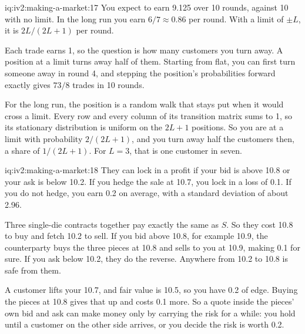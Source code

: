\begin{solution}{iq:iv2:making-a-market:17}
You expect to earn 9.125 over 10 rounds, against 10 with no limit. In the long run you earn $6/7 \approx 0.86$ per round. With a limit of $\pm L$, it is $2L/(2L + 1)$ per round.

Each trade earns 1, so the question is how many customers you turn away. A position at a limit turns away half of them. Starting from flat, you can first turn someone away in round 4, and stepping the position's probabilities forward exactly gives $73/8$ trades in 10 rounds.

For the long run, the position is a random walk that stays put when it would cross a limit. Every row and every column of its transition matrix sums to 1, so its stationary distribution is uniform on the $2L + 1$ positions. So you are at a limit with probability $2/(2L + 1)$, and you turn away half the customers then, a share of $1/(2L + 1)$. For $L = 3$, that is one customer in seven.

\end{solution}

\begin{solution}{iq:iv2:making-a-market:18}
They can lock in a profit if your bid is above 10.8 or your ask is below 10.2. If you hedge the sale at 10.7, you lock in a loss of 0.1. If you do not hedge, you earn 0.2 on average, with a standard deviation of about 2.96.

Three single-die contracts together pay exactly the same as $S$. So they cost 10.8 to buy and fetch 10.2 to sell. If you bid above 10.8, for example 10.9, the counterparty buys the three pieces at 10.8 and sells to you at 10.9, making 0.1 for sure. If you ask below 10.2, they do the reverse. Anywhere from 10.2 to 10.8 is safe from them.

A customer lifts your 10.7, and fair value is 10.5, so you have 0.2 of edge. Buying the pieces at 10.8 gives that up and costs 0.1 more. So a quote inside the pieces' own bid and ask can make money only by carrying the risk for a while: you hold until a customer on the other side arrives, or you decide the risk is worth 0.2.

\end{solution}

